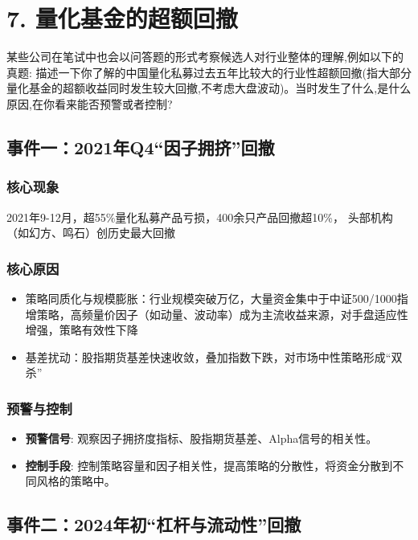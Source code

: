 \documentclass[UTF8]{ctexart}
\begin{document}
\section*{7. 量化基金的超额回撤}

某些公司在笔试中也会以问答题的形式考察候选人对行业整体的理解,例如以下的真题:
描述一下你了解的中国量化私募过去五年比较大的行业性超额回撤(指大部分量化基金的超额收益同时发生较大回撤,不考虑大盘波动)。当时发生了什么,是什么原因,在你看来能否预警或者控制?


\subsection*{事件一：2021年Q4“因子拥挤”回撤}

\subsubsection*{核心现象}
2021年9-12月，超55$\%$量化私募产品亏损，400余只产品回撤超10\%，
头部机构（如幻方、鸣石）创历史最大回撤

\subsubsection*{核心原因}
\begin{itemize}
    \item 策略同质化与规模膨胀：行业规模突破万亿，大量资金集中于中证500/1000指增策略，高频量价因子（如动量、波动率）成为主流收益来源，对手盘适应性增强，策略有效性下降
    \item 基差扰动：股指期货基差快速收敛，叠加指数下跌，对市场中性策略形成“双杀”
\end{itemize}


\subsubsection*{预警与控制}
\begin{itemize}
    \item \textbf{预警信号}: 观察因子拥挤度指标、股指期货基差、Alpha信号的相关性。
    \item \textbf{控制手段}: 控制策略容量和因子相关性，提高策略的分散性，将资金分散到不同风格的策略中。
\end{itemize}

\subsection*{事件二：2024年初“杠杆与流动性”回撤}
\end{document}
